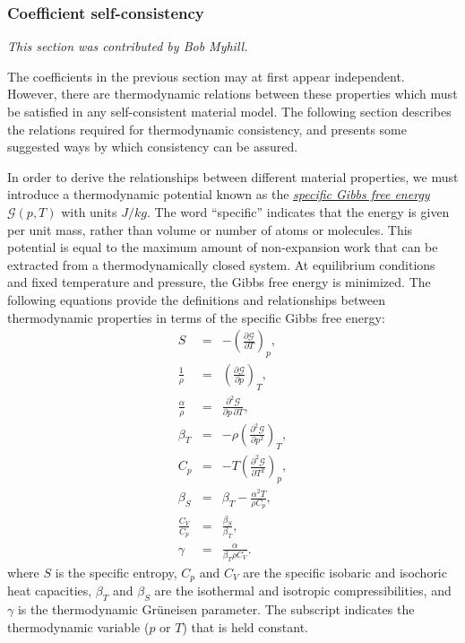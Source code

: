 \documentclass{article}
\begin{document}
\subsubsection{Coefficient self-consistency}
\label{sec:coefficient_self_consistency}
\textit{This section was contributed by Bob Myhill.}

The coefficients in the previous section may at first appear independent.
However, there are thermodynamic relations between these properties which must be
satisfied in any self-consistent material model.
The following section describes the relations required for thermodynamic
consistency, and presents some suggested ways by which consistency can be assured.

In order to derive the relationships between different material properties, we must
introduce a thermodynamic potential known as the
\href{https://en.wikipedia.org/wiki/Gibbs_free_energy}{\textit{specific
    Gibbs free energy}}
$\mathcal{G}(p, T)$ with units $\si{J}/\si{kg}$. The word ``specific'' indicates that the energy is
given per unit mass, rather than volume or number of atoms or molecules. This potential is
equal to the maximum amount of non-expansion work that can be extracted from a
thermodynamically closed system. At equilibrium conditions and fixed temperature and
pressure, the Gibbs free energy is minimized. The following equations provide the
definitions and relationships between thermodynamic properties in terms of the specific
Gibbs free energy:
\begin{eqnarray}
  S &=& - \left( \frac{\partial \mathcal{G}}{\partial T} \right)_{p}, \\
  \frac{1}{\rho} &=& \left( \frac{\partial \mathcal{G}}{\partial p} \right)_{T}, \label{eq:mm_density} \\
  \frac{\alpha}{\rho} &=& \frac{\partial^2 \mathcal{G}}{\partial {p} \, \partial {T}}, \label{eq:mm_alpha_g} \\
  \beta_T &=& -\rho \left( \frac{\partial^2 \mathcal{G}}{\partial {p}^2}  \right)_{T}, \label{eq:mm_betaT_g} \\
  C_p &=& -T \left( \frac{\partial^2 \mathcal{G}}{\partial {T}^2}  \right)_{p}, \label{eq:mm_isobaric_heat_capacity} \\
  \beta_S &=& \beta_T - \frac{\alpha^2 T}{\rho C_p}, \label{eq:mm_isentropic_compressibility} \\
  \frac{C_V}{C_p} &=& \frac{\beta_S}{\beta_T}, \\
  \gamma &=& \frac{\alpha }{\beta_T \rho C_V}.
\end{eqnarray}
where $S$ is the specific entropy, $C_p$ and $C_V$ are the specific isobaric
and isochoric heat capacities, $\beta_T$ and $\beta_S$ are the isothermal and isotropic
compressibilities, and $\gamma$ is the thermodynamic Gr\"{u}neisen parameter. The subscript
indicates the thermodynamic variable ($p$ or $T$) that is held constant.
\end{document}
